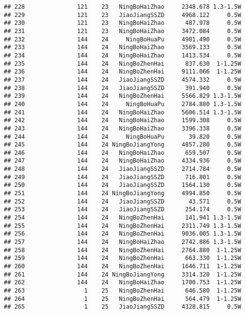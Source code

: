 \documentclass[]{article}
\begin{document}
\begin{verbatim}
## 228               121    23   NingBoHaiZhao     2348.678 1.3-1.5W
## 229               121    23   JiaoJiangSSZD     4968.122     0.5W
## 230               121    23   NingBoHaiZhao      487.978     0.5W
## 231               121    23   NingBoHaiZhao     3472.084     0.5W
## 232               144    24     NingBoHuaPu     4981.490     0.5W
## 233               144    24   NingBoHaiZhao     3569.133     0.5W
## 234               144    24   NingBoHaiZhao     1413.534     0.5W
## 235               144    24   NingBoZhenHai      837.630  1-1.25W
## 236               144    24   NingBoZhenHai     9111.066  1-1.25W
## 237               144    24   JiaoJiangSSZD     4574.332     0.5W
## 238               144    24   JiaoJiangSSZD      391.940     0.5W
## 239               144    24   NingBoZhenHai     5566.829 1.3-1.5W
## 240               144    24     NingBoHuaPu     2784.880 1.3-1.5W
## 241               144    24   NingBoHaiZhao     5606.514 1.3-1.5W
## 242               144    24   NingBoHaiZhao     1599.308     0.5W
## 243               144    24   NingBoHaiZhao     3396.338     0.5W
## 244               144    24     NingBoHuaPu       39.820     0.5W
## 245               144    24 NingBoJiangYong     4857.280     0.5W
## 246               144    24   NingBoHaiZhao      659.507     0.5W
## 247               144    24   NingBoHaiZhao     4334.936     0.5W
## 248               144    24   JiaoJiangSSZD     2714.784     0.5W
## 249               144    24   JiaoJiangSSZD      716.801     0.5W
## 250               144    24   JiaoJiangSSZD     1564.130     0.5W
## 251               144    24 NingBoJiangYong     4994.850     0.5W
## 252               144    24   JiaoJiangSSZD       43.571     0.5W
## 253               144    24   JiaoJiangSSZD      254.174     0.5W
## 254               144    24   NingBoZhenHai      141.941 1.3-1.5W
## 255               144    24   NingBoZhenHai     2311.749 1.3-1.5W
## 256               144    24   NingBoZhenHai     9036.005 1.3-1.5W
## 257               144    24   NingBoHaiZhao     2742.886 1.3-1.5W
## 258               144    24   NingBoZhenHai     2764.880  1-1.25W
## 259               144    24   NingBoZhenHai      663.330  1-1.25W
## 260               144    24   NingBoZhenHai     1646.711  1-1.25W
## 261               144    24 NingBoJiangYong     3314.320  1-1.25W
## 262               144    24   NingBoHaiZhao     1700.753  1-1.25W
## 263                 1    25   NingBoZhenHai      646.580  1-1.25W
## 264                 1    25   NingBoZhenHai      564.479  1-1.25W
## 265                 1    25   JiaoJiangSSZD     4328.815     0.5W

\end{verbatim}
\end{document}
